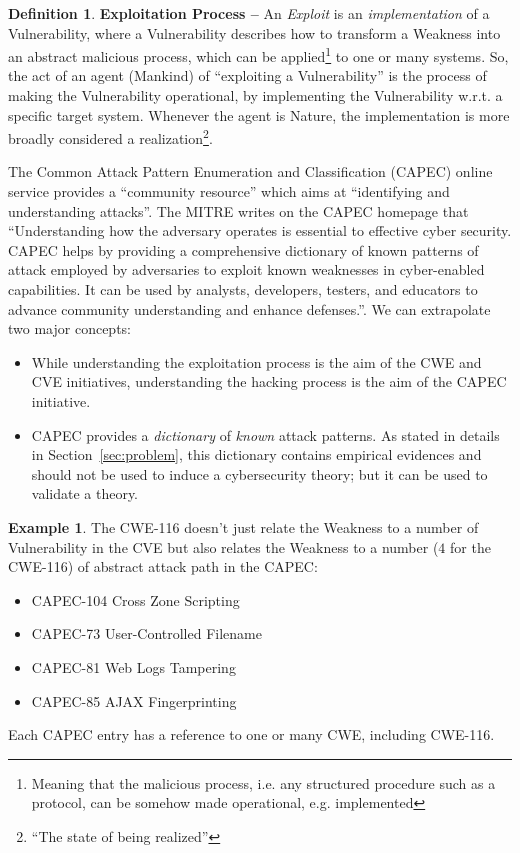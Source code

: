 \documentclass{article}
\theoremstyle{definition}
\newtheorem{definition}{Definition}[section]
\theoremstyle{corollary}
\theoremstyle{lemma}
\theoremstyle{theorem}
\theoremstyle{theorem}
\newtheorem{example}{Example}
\begin{document}
\begin{definition}{\bf Exploitation Process --} An \emph{Exploit} is an \emph{implementation} of
a Vulnerability, where a Vulnerability describes how to transform a
Weakness into an abstract malicious process, which can be applied\footnote{Meaning that the
malicious process, i.e.  any structured procedure such as a protocol, can be
somehow made operational, e.g. implemented} to one or many systems. So, the act
of an agent (Mankind) of ``exploiting a Vulnerability'' is the process of
making the Vulnerability operational, by implementing the Vulnerability w.r.t.
a specific target system.  Whenever the agent is Nature, the implementation is
more broadly considered a realization\footnote{``The state of being
realized''\autocite{Merriam2020realization}}. 
\end{definition}

The Common Attack Pattern Enumeration and
Classification\autocite{MITRE2020CAPEC} (CAPEC) online service provides a
``community resource'' which aims at ``identifying and understanding attacks''.
The MITRE writes on the CAPEC homepage that ``Understanding how the adversary
operates is essential to effective cyber security. CAPEC helps by providing a
comprehensive dictionary of known patterns of attack employed by adversaries to
exploit known weaknesses in cyber-enabled capabilities. It can be used by
analysts, developers, testers, and educators to advance community understanding
and enhance defenses.''. We can extrapolate two major concepts: 
\begin{itemize}
	\item While understanding the exploitation process is the aim of the
		CWE and CVE initiatives, understanding the hacking process is
		the aim of the CAPEC initiative.
	\item CAPEC provides a \emph{dictionary} of \emph{known} attack patterns.
		As stated in details in Section~\ref{sec:problem}, this dictionary contains
		empirical evidences and should not be used to induce a cybersecurity 
		theory; but it can be used to validate a theory.
\end{itemize}

\begin{example}
The CWE-116 doesn't just relate the Weakness to a number of Vulnerability in
	the CVE but also relates the Weakness to a number ($4$ for the CWE-116)
	of abstract attack path in the CAPEC:
	\begin{itemize}
		\item CAPEC-104\autocite{CAPEC-104} Cross Zone Scripting
		\item CAPEC-73\autocite{CAPEC-73} User-Controlled Filename
		\item CAPEC-81\autocite{CAPEC-81} Web Logs Tampering
		\item CAPEC-85\autocite{CAPEC-85} AJAX Fingerprinting
	\end{itemize}

	Each CAPEC entry has a reference to one or many CWE, including CWE-116.
\end{example}
\end{document}
